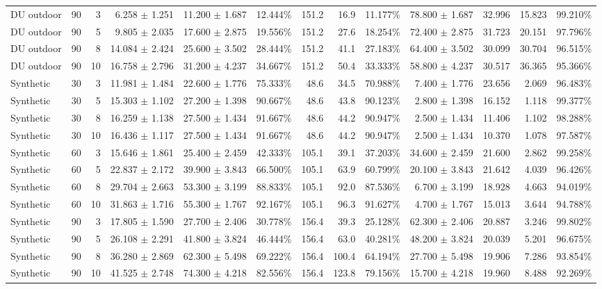 \documentclass[10pt,a4paper]{article}
\begin{document}
\begin{landscape}
\begin{longtable}{@{}llrrrrrrrrrrr@{}}
DU outdoor & 90 & 3 & 6.258 $\pm$ 1.251 & 11.200 $\pm$ 1.687 & 12.444\% & 151.2 & 16.9 & 11.177\% & 78.800 $\pm$ 1.687 & 32.996 & 15.823 & 99.210\% \\
DU outdoor & 90 & 5 & 9.805 $\pm$ 2.035 & 17.600 $\pm$ 2.875 & 19.556\% & 151.2 & 27.6 & 18.254\% & 72.400 $\pm$ 2.875 & 31.723 & 20.151 & 97.796\% \\
DU outdoor & 90 & 8 & 14.084 $\pm$ 2.424 & 25.600 $\pm$ 3.502 & 28.444\% & 151.2 & 41.1 & 27.183\% & 64.400 $\pm$ 3.502 & 30.099 & 30.704 & 96.515\% \\
DU outdoor & 90 & 10 & 16.758 $\pm$ 2.796 & 31.200 $\pm$ 4.237 & 34.667\% & 151.2 & 50.4 & 33.333\% & 58.800 $\pm$ 4.237 & 30.517 & 36.365 & 95.366\% \\
Synthetic & 30 & 3 & 11.981 $\pm$ 1.484 & 22.600 $\pm$ 1.776 & 75.333\% & 48.6 & 34.5 & 70.988\% & 7.400 $\pm$ 1.776 & 23.656 & 2.069 & 96.483\% \\
Synthetic & 30 & 5 & 15.303 $\pm$ 1.102 & 27.200 $\pm$ 1.398 & 90.667\% & 48.6 & 43.8 & 90.123\% & 2.800 $\pm$ 1.398 & 16.152 & 1.118 & 99.377\% \\
Synthetic & 30 & 8 & 16.259 $\pm$ 1.138 & 27.500 $\pm$ 1.434 & 91.667\% & 48.6 & 44.2 & 90.947\% & 2.500 $\pm$ 1.434 & 11.406 & 1.102 & 98.288\% \\
Synthetic & 30 & 10 & 16.436 $\pm$ 1.117 & 27.500 $\pm$ 1.434 & 91.667\% & 48.6 & 44.2 & 90.947\% & 2.500 $\pm$ 1.434 & 10.370 & 1.078 & 97.587\% \\
Synthetic & 60 & 3 & 15.646 $\pm$ 1.861 & 25.400 $\pm$ 2.459 & 42.333\% & 105.1 & 39.1 & 37.203\% & 34.600 $\pm$ 2.459 & 21.600 & 2.862 & 99.258\% \\
Synthetic & 60 & 5 & 22.837 $\pm$ 2.172 & 39.900 $\pm$ 3.843 & 66.500\% & 105.1 & 63.9 & 60.799\% & 20.100 $\pm$ 3.843 & 21.642 & 4.039 & 96.426\% \\
Synthetic & 60 & 8 & 29.704 $\pm$ 2.663 & 53.300 $\pm$ 3.199 & 88.833\% & 105.1 & 92.0 & 87.536\% & 6.700 $\pm$ 3.199 & 18.928 & 4.663 & 94.019\% \\
Synthetic & 60 & 10 & 31.863 $\pm$ 1.716 & 55.300 $\pm$ 1.767 & 92.167\% & 105.1 & 96.3 & 91.627\% & 4.700 $\pm$ 1.767 & 15.013 & 3.644 & 94.788\% \\
Synthetic & 90 & 3 & 17.805 $\pm$ 1.590 & 27.700 $\pm$ 2.406 & 30.778\% & 156.4 & 39.3 & 25.128\% & 62.300 $\pm$ 2.406 & 20.887 & 3.246 & 99.802\% \\
Synthetic & 90 & 5 & 26.108 $\pm$ 2.291 & 41.800 $\pm$ 3.824 & 46.444\% & 156.4 & 63.0 & 40.281\% & 48.200 $\pm$ 3.824 & 20.039 & 5.201 & 96.675\% \\
Synthetic & 90 & 8 & 36.280 $\pm$ 2.869 & 62.300 $\pm$ 5.498 & 69.222\% & 156.4 & 100.4 & 64.194\% & 27.700 $\pm$ 5.498 & 19.906 & 7.286 & 93.854\% \\
Synthetic & 90 & 10 & 41.525 $\pm$ 2.748 & 74.300 $\pm$ 4.218 & 82.556\% & 156.4 & 123.8 & 79.156\% & 15.700 $\pm$ 4.218 & 19.960 & 8.488 & 92.269\% \\
\bottomrule
\end{longtable}


\end{landscape}
\end{document}
